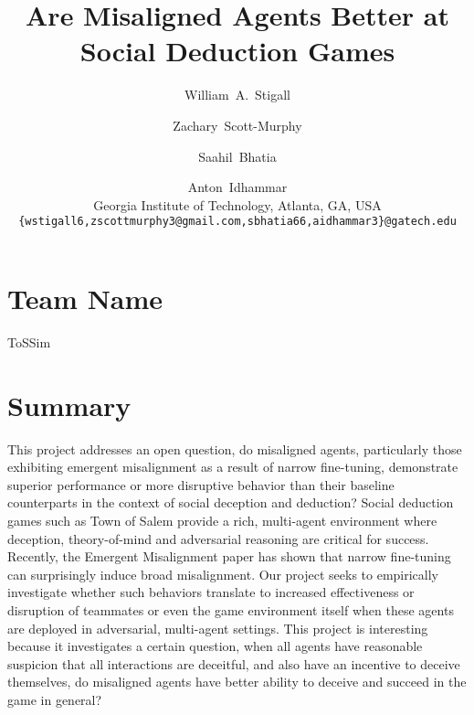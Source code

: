 \documentclass[10pt,onecolumn,letterpaper]{article}
\begin{document}
\title{Are Misaligned Agents Better at Social Deduction Games}

\author{
  William~A.~Stigall \and
  Zachary~Scott-Murphy \and
  Saahil~Bhatia \and
  Anton~Idhammar \\[0.5em]
  Georgia Institute of Technology, Atlanta, GA, USA \\[0.25em]
  {\tt\small\{wstigall6,zscottmurphy3@gmail.com,sbhatia66,aidhammar3\}@gatech.edu}
}




\maketitle


\section{Team Name}
ToSSim
\section{Summary}
This project addresses an open question, do misaligned agents, particularly those exhibiting emergent misalignment as a result of narrow fine-tuning, demonstrate superior performance or more disruptive behavior than their baseline counterparts in the context of social deception and deduction? Social deduction games such as Town of Salem provide a rich, multi-agent environment where deception, theory-of-mind and adversarial reasoning are critical for success. Recently, the Emergent Misalignment paper has shown that narrow fine-tuning can surprisingly induce broad misalignment\cite{betley2025emergentmisalignmentnarrowfinetuning}. Our project seeks to empirically investigate whether such behaviors translate to increased effectiveness or disruption of teammates or even the game environment itself when these agents are deployed in adversarial, multi-agent settings. This project is interesting because it investigates a certain question, when all agents have reasonable suspicion that all interactions are deceitful, and also have an incentive to deceive themselves, do misaligned agents have better ability to deceive and succeed in the game in general?
\end{document}
